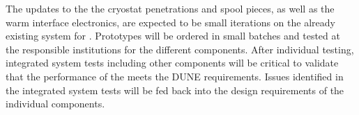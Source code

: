 The updates to the the  cryostat penetrations and spool pieces, as well as the warm interface electronics, are expected to be small iterations on the already existing system for .  Prototypes will be ordered in small batches and tested at the responsible institutions for the different components.  After individual testing, integrated system tests including other  components will be critical to validate that the performance of the  meets the DUNE  requirements.  Issues identified in the integrated system tests will be fed back into the design requirements of the individual components.

